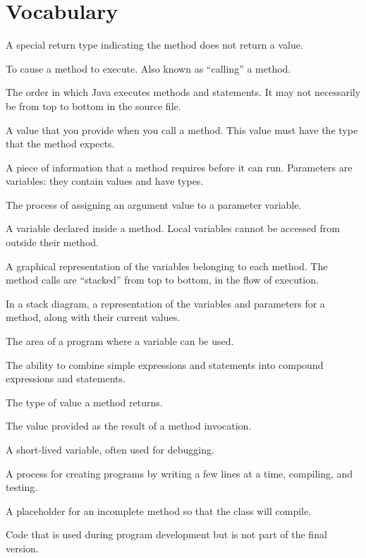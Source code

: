 \section{Vocabulary}

\begin{description}


A special return type indicating the method does not return a value.

To cause a method to execute.
Also known as ``calling'' a method.

The order in which Java executes methods and statements.
It may not necessarily be from top to bottom in the source file.

A value that you provide when you call a method.
This value must have the type that the method expects.

A piece of information that a method requires before it can run.
Parameters are variables: they contain values and have types.

The process of assigning an argument value to a parameter variable.

A variable declared inside a method.
Local variables cannot be accessed from outside their method.

A graphical representation of the variables belonging to each method.
The method calls are ``stacked'' from top to bottom, in the flow of execution.

In a stack diagram, a representation of the variables and parameters for a method, along with their current values.

The area of a program where a variable can be used.

The ability to combine simple expressions and statements into compound expressions and statements.

The type of value a method returns.

The value provided as the result of a method invocation.

A short-lived variable, often used for debugging.

A process for creating programs by writing a few lines at a time, compiling, and testing.

A placeholder for an incomplete method so that the class will compile.

Code that is used during program development but is not part of the final version.

\end{description}


